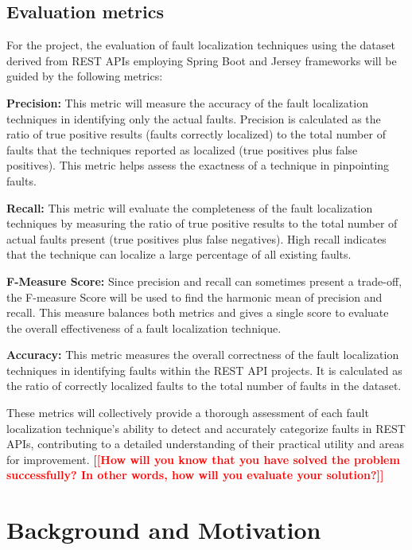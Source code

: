 \documentclass[conference]{IEEEtran}
\newcommand{\todo}[1]{\textcolor{red}{{\bfseries [[#1]]}}}
\begin{document}
\subsection{Evaluation metrics}
For the project, the evaluation of fault localization techniques using the dataset derived from REST APIs employing Spring Boot and Jersey frameworks will be guided by the following metrics:

\textbf{Precision:} This metric will measure the accuracy of the fault localization techniques in identifying only the actual faults. Precision is calculated as the ratio of true positive results (faults correctly localized) to the total number of faults that the techniques reported as localized (true positives plus false positives). This metric helps assess the exactness of a technique in pinpointing faults.


\textbf{Recall:} This metric will evaluate the completeness of the fault localization techniques by measuring the ratio of true positive results to the total number of actual faults present (true positives plus false negatives). High recall indicates that the technique can localize a large percentage of all existing faults.


\textbf{F-Measure Score:} Since precision and recall can sometimes present a trade-off, the F-measure Score will be used to find the harmonic mean of precision and recall. This measure balances both metrics and gives a single score to evaluate the overall effectiveness of a fault localization technique.

\textbf{Accuracy:} This metric measures the overall correctness of the fault localization techniques in identifying faults within the REST API projects. It is calculated as the ratio of correctly localized faults to the total number of faults in the dataset. 

These metrics will collectively provide a thorough assessment of each fault localization technique's ability to detect and accurately categorize faults in REST APIs, contributing to a detailed understanding of their practical utility and areas for improvement.
    \todo{How will you know that you have solved the problem successfully? In other words, how will you evaluate your solution?}


\section{Background and Motivation}
\label{sec:background-and-motivation}
\end{document}
